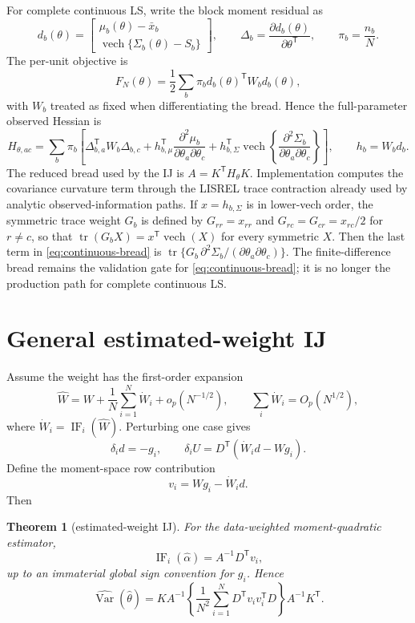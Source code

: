 \documentclass[11pt]{article}
\newcommand{\tr}{\operatorname{tr}}
\newcommand{\Var}{\operatorname{Var}}
\newcommand{\vech}{\operatorname{vech}}
\newcommand{\T}{^{\mathsf T}}
\newcommand{\IF}{\operatorname{IF}}
\theoremstyle{plain}
\newtheorem{theorem}{Theorem}
\theoremstyle{remark}
\begin{document}
For complete continuous LS, write the block moment residual as
\[
  d_b(\theta)=
  \begin{bmatrix}
    \mu_b(\theta)-\bar x_b\\
    \vech\{\Sigma_b(\theta)-S_b\}
  \end{bmatrix},\qquad
  \Delta_b=\frac{\partial d_b(\theta)}{\partial\theta\T},\qquad
  \pi_b=\frac{n_b}{N}.
\]
The per-unit objective is
\[
  F_N(\theta)=\frac12\sum_b \pi_b d_b(\theta)\T W_b d_b(\theta),
\]
with $W_b$ treated as fixed when differentiating the bread. Hence the
full-parameter observed Hessian is
\begin{equation}\label{eq:continuous-bread}
  H_{\theta,ac}
  =
  \sum_b \pi_b
  \left[
    \Delta_{b,a}\T W_b\Delta_{b,c}
    + h_{b,\mu}\T
      \frac{\partial^2\mu_b}{\partial\theta_a\partial\theta_c}
    + h_{b,\Sigma}\T
      \vech\left\{
      \frac{\partial^2\Sigma_b}
           {\partial\theta_a\partial\theta_c}\right\}
  \right],
  \qquad h_b=W_bd_b .
\end{equation}
The reduced bread used by the IJ is $A=K\T H_\theta K$. Implementation computes
the covariance curvature term through the LISREL trace contraction already used
by analytic observed-information paths. If $x=h_{b,\Sigma}$ is in lower-vech
order, the symmetric trace weight $G_b$ is defined by
$G_{rr}=x_{rr}$ and $G_{rc}=G_{cr}=x_{rc}/2$ for $r\ne c$, so that
$\tr(G_b X)=x\T\vech(X)$ for every symmetric $X$. Then the last term in
\eqref{eq:continuous-bread} is
$\tr\{G_b\,\partial^2\Sigma_b/
(\partial\theta_a\partial\theta_c)\}$.
The finite-difference bread remains the validation gate for
\eqref{eq:continuous-bread}; it is no longer the production path for complete
continuous LS.

\section{General estimated-weight IJ}

Assume the weight has the first-order expansion
\[
  \hat W = W + \frac1N\sum_{i=1}^N \dot W_i + o_p(N^{-1/2}),
  \qquad \sum_i \dot W_i = O_p(N^{1/2}),
\]
where $\dot W_i=\IF_i(\hat W)$. Perturbing one case gives
\[
  \delta_i d = -g_i, \qquad
  \delta_i U = D\T(\dot W_i d - Wg_i).
\]
Define the moment-space row contribution
\begin{equation}\label{eq:v}
  v_i = Wg_i - \dot W_i d.
\end{equation}
Then
\begin{theorem}[estimated-weight IJ]\label{thm:ij}
For the data-weighted moment-quadratic estimator,
\[
  \IF_i(\hat\alpha) = A^{-1}D\T v_i,
\]
up to an immaterial global sign convention for $g_i$. Hence
\begin{equation}\label{eq:vcov}
  \widehat{\Var}(\hat\theta)
  =
  K A^{-1}
    \left\{ \frac1{N^2}\sum_{i=1}^N D\T v_i v_i\T D \right\}
  A^{-1}K\T .
\end{equation}
\end{theorem}
\end{document}
